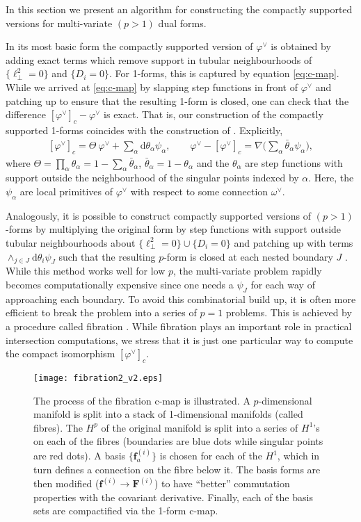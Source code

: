 \documentclass[11pt]{article}
\renewcommand{\d}{\text{d}}
\newcommand{\vphi}{\varphi}
\renewcommand{\th}{\theta}
\newcommand{\bs}[1]{\boldsymbol{#1}}
\begin{document}
In this section we present an algorithm for constructing the compactly supported versions for multi-variate $(p>1)$ dual forms.

In its most basic form the compactly supported version of $\vphi^\vee$ is obtained by adding exact terms which remove support in tubular neighbourhoods of $\{\ell_\perp^2=0\}$ and $\{D_i=0\}$. For 1-forms, this is captured by equation \eqref{eq:c-map}. While we arrived at \eqref{eq:c-map} by slapping step functions in front of $\vphi^\vee$ and patching up to ensure that the resulting 1-form is closed, one can check that the difference $[\vphi^\vee]_c - \vphi^\vee$ is exact. That is, our construction of the compactly supported 1-forms coincides with the construction of \cite{matsuo1998}. 
Explicitly,
\begin{align} \label{eq:c-map2}
	[\vphi^\vee]_c = \Theta\ \vphi^\vee + \sum_\alpha \d\th_\alpha \psi_\alpha,
	\qquad 
	\vphi^\vee - [\vphi^\vee]_c = \nabla \Big( \sum_\alpha \bar{\theta}_\alpha \psi_\alpha \Big),
\end{align}
where $\Theta = \prod_\alpha\th_\alpha = 1 - \sum_\alpha \bar{\theta}_\alpha$, $\bar{\th}_\alpha = 1-\theta_\alpha$ and the $\th_\alpha$ are step functions with support outside the neighbourhood of the singular points indexed by $\alpha$. Here, the $\psi_\alpha$ are local primitives of $\vphi^\vee$ with respect to some connection $\omega^\vee$. 

Analogously, it is possible to construct compactly supported versions of $(p>1)$-forms by multiplying the original form by step functions with support outside tubular neighbourhoods about $\{\ell_\perp^2=0\}\cup\{D_i=0\}$ and patching up with terms $\wedge_{j\in J} \d\theta_i \psi_J$ such that the resulting $p$-form is closed at each nested boundary $J$ \cite{matsuo1998}.
While this method works well for low $p$, the multi-variate problem rapidly becomes computationally expensive since one needs a $\psi_J$ for each way of approaching each boundary. To avoid this combinatorial build up, it is often more efficient to break the problem into a series of $p=1$ problems. This is achieved by a procedure called fibration \cite{Mizera:2019gea, Frellesvig:2019kgj, Frellesvig:2019uqt}. While fibration plays an important role in practical intersection computations, we stress that it is just one particular way to compute the compact isomorphism $[\vphi^\vee]_c$. 

\begin{figure}
	\centering
	\texttt{[image: fibration2\_v2.eps]}
	\caption{ \label{fig:fib sum}
	The process of the fibration c-map is illustrated. A $p$-dimensional manifold is split into a stack of 1-dimensional manifolds (called fibres). The $H^p$ of the original manifold is split into a series of $H^1$'s on each of the fibres (boundaries are blue dots while singular points are red dots). A basis $\{\bs{f}^{(i)}_a\}$ is chosen for each of the $H^1$, which in turn defines a connection on the fibre below it. The basis forms are then modified ($\bs{f}^{(i)}\to\bs{F}^{(i)}$) to have ``better'' commutation properties with the covariant derivative. Finally, each of the basis sets are compactified via the 1-form c-map.
	}
\end{figure}
\end{document}
